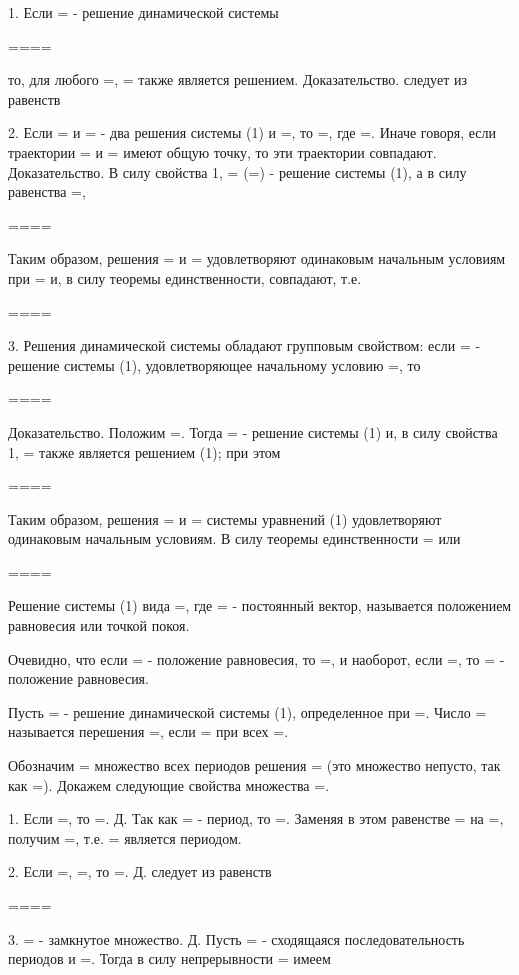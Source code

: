 \documentclass{article}
\theoremstyle{plain} \newtheorem*{theorem*}{Теорема}
\theoremstyle{plain} \newtheorem{theorem}{Теорема}[section]
\begin{document}
\abovedisplayskip=0pt
\belowdisplayskip=9pt
\abovedisplayshortskip=0pt
\belowdisplayshortskip=9pt

1. Если = - решение динамической системы

====

то, для любого =, = также является решением.
Доказательство. следует из равенств

2. Если = и = - два решения системы (1) и =, то =, где =.
Иначе говоря, если траектории = и = имеют общую точку,
то эти траектории совпадают.
Доказательство. В силу свойства 1, = (=) - решение системы (1),
а в силу равенства =,

====

Таким образом, решения = и = удовлетворяют одинаковым начальным
условиям при = и, в силу теоремы единственности, совпадают, т.е.

====

3. Решения динамической системы обладают групповым свойством:
если = - решение системы (1), удовлетворяющее начальному условию =, то

====

Доказательство. Положим =. Тогда = - решение системы (1) и,
в силу свойства 1, = также является решением (1); при этом


====

Таким образом, решения = и = системы уравнений (1) удовлетворяют
одинаковым начальным условиям. В силу теоремы единственности = или

====

Решение системы (1) вида =, где = - постоянный вектор, называется
положением равновесия или точкой покоя.

Очевидно, что если = - положение равновесия, то =, и наоборот,
если =, то = - положение равновесия.

Пусть = - решение динамической системы (1), определенное при =.
Число = называется перешения =, если = при всех =.

Обозначим = множество всех периодов решения =
(это множество непусто, так как =).
Докажем следующие свойства множества =.

1. Если =, то =.
Д. Так как = - период, то =. Заменяя в этом равенстве = на =, получим
=, т.е. = является периодом.

2. Если =, =, то =.
Д. следует из равенств

====

3. = - замкнутое множество.
Д. Пусть = - сходящаяся последовательность периодов и =. Тогда в силу
непрерывности = имеем
\end{document}

